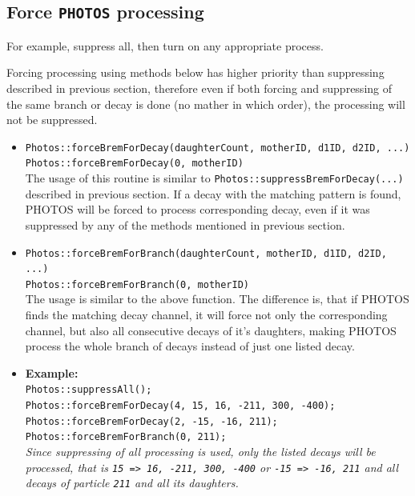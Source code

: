 \documentclass[]{Photos_interface_design}
\begin{document}
\subsection{{\bf Force {\tt PHOTOS} processing } }
\label{section:force}

For example, suppress all, then turn on any appropriate process.

Forcing processing using methods below has higher priority than suppressing described
in previous section, therefore even if both forcing and suppressing of the same
branch or decay is done (no mather in which order), the processing will not be
suppressed.

\begin{itemize}

 \item {\tt Photos::forceBremForDecay(daughterCount, motherID, d1ID, d2ID, ...)} \hfill \\
       {\tt Photos::forceBremForDecay(0, motherID)} \hfill \\
       The usage of this routine is similar to {\tt Photos::suppressBremForDecay(...)}
	   described in previous section. If a decay with the matching pattern is found,
	   PHOTOS will be forced to process corresponding decay, even if it was suppressed
	   by any of the methods mentioned in previous section.
 \item {\tt Photos::forceBremForBranch(daughterCount, motherID, d1ID, d2ID, ...)} \hfill \\
       {\tt Photos::forceBremForBranch(0, motherID)} \hfill \\
       The usage is similar to the above function. The difference is,
	   that if PHOTOS finds the matching decay channel, it will force not only the corresponding channel,
	   but also all consecutive decays of it's daughters, making PHOTOS process the whole branch
	   of decays instead of just one listed decay.
 \item \textbf{Example:} \hfill \\
{\tt Photos::suppressAll(); } \\
{\tt Photos::forceBremForDecay(4, 15, 16, -211, 300, -400); } \\
{\tt Photos::forceBremForDecay(2, -15, -16, 211); } \\
{\tt Photos::forceBremForBranch(0, 211); } \\
\emph{Since suppressing of all processing is used, only the listed decays will be processed, that is
{\tt 15 => 16, -211, 300, -400} or {\tt -15 => -16, 211} and all decays of particle {\tt 211} and
all its daughters.}
\end{itemize}
\end{document}
